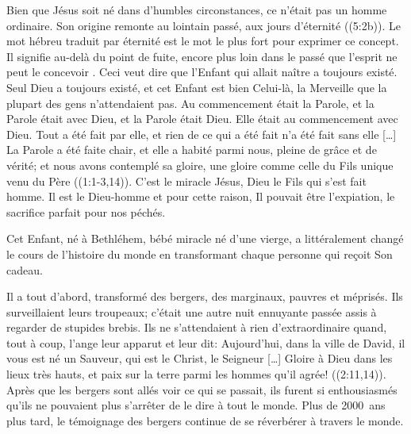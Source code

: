 

Bien que Jésus soit né dans d'humbles circonstances, ce n'était pas un homme ordinaire. Son \og origine remonte au lointain passé, aux jours d'éternité \fg{} ((5:2b)). Le mot hébreu traduit par \og éternité \fg{} est le mot le plus fort pour exprimer ce concept. Il signifie \og au-delà du point de fuite, encore plus loin dans le passé que l'esprit ne peut le concevoir \fg{}. Ceci veut dire que l'Enfant qui allait naître a toujours existé. Seul Dieu a toujours existé, et cet Enfant est bien Celui-là, la Merveille que la plupart des gens n'attendaient pas. \og Au commencement était la Parole, et la Parole était avec Dieu, et la Parole était Dieu. Elle était au commencement avec Dieu. Tout a été fait par elle, et rien de ce qui a été fait n’a été fait sans elle […] La Parole a été faite chair, et elle a habité parmi nous, pleine de grâce et de vérité; et nous avons contemplé sa gloire, une gloire comme celle du Fils unique venu du Père \fg{} ((1:1-3,14)). C'est le miracle \ocadr Jésus, Dieu le Fils qui s'est fait homme. Il est le Dieu-homme et pour cette raison, Il pouvait être l'expiation, le sacrifice parfait pour nos péchés.

Cet Enfant, né à Bethléhem, bébé miracle né d'une vierge, a littéralement changé le cours de l'histoire du monde en transformant chaque personne qui reçoit Son cadeau.

Il a tout d'abord, transformé des bergers, des marginaux, pauvres et méprisés. Ils surveillaient leurs troupeaux; c'était une autre nuit ennuyante passée assis à regarder de stupides brebis. Ils ne s'attendaient à rien d'extraordinaire quand, tout à coup, l'ange leur apparut et leur dit:
\og Aujourd’hui, dans la ville de David, il vous est né un Sauveur, qui est le Christ, le Seigneur […] Gloire à Dieu dans les lieux très hauts, et paix sur la terre parmi les hommes qu’il agrée! \fg{} ((2:11,14)). Après que les bergers sont allés voir ce qui se passait, ils furent si enthousiasmés qu'ils ne pouvaient plus s'arrêter de le dire à tout le monde. Plus de 2000~ans plus tard, le témoignage des bergers continue de se réverbérer à travers le monde.

